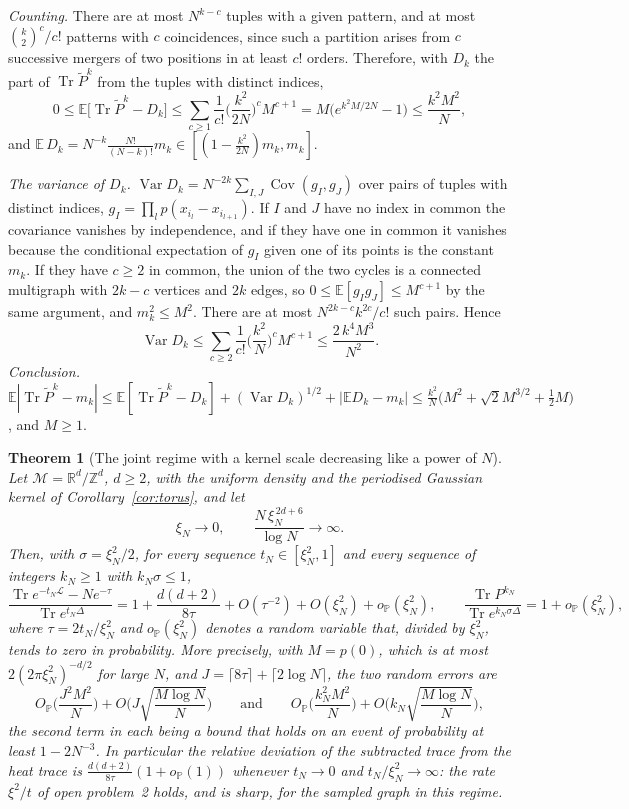 \documentclass[11pt,a4paper]{article}
\makeatletter
\theoremstyle{stmt}
\newtheorem{theorem}{Theorem}[section]
\theoremstyle{defn}
\theoremstyle{rmk}
\renewenvironment{proof}[1][\proofname]{\par\pushQED{\qed}\normalfont\topsep6\p@\@plus6\p@\relax
  \trivlist\item[\hskip\labelsep{\sffamily\itshape\small #1.}]\ignorespaces}{\popQED\endtrivlist\@endpefalse}
\numberwithin{equation}{section}
\DeclareMathOperator{\Tr}{Tr}
\newcommand{\M}{\mathcal{M}}
\newcommand{\Lc}{\mathcal{L}}
\newcommand{\R}{\mathbb{R}}
\makeatother
\begin{document}
{\begin{proof}
\emph{Counting.} There are at most $N^{k-c}$ tuples with a given pattern, and at most $\binom k2^c/c!$ patterns with $c$ coincidences, since such a partition arises from $c$ successive mergers of two positions in at least $c!$ orders. Therefore, with $D_k$ the part of $\Tr\tilde P^k$ from the tuples with distinct indices,
\[
0\le\mathbb E\big[\Tr\tilde P^k-D_k\big]\le\sum_{c\ge1}\frac{1}{c!}\Big(\frac{k^2}{2N}\Big)^cM^{c+1}=M\big(e^{k^2M/2N}-1\big)\le\frac{k^2M^2}{N},
\]
and $\mathbb E\,D_k=N^{-k}\frac{N!}{(N-k)!}m_k\in[(1-\frac{k^2}{2N})m_k,m_k]$.

\emph{The variance of $D_k$.} $\operatorname{Var}D_k=N^{-2k}\sum_{I,J}\operatorname{Cov}(g_I,g_J)$ over pairs of tuples with distinct indices, $g_I=\prod_lp(x_{i_l}-x_{i_{l+1}})$. If $I$ and $J$ have no index in common the covariance vanishes by independence, and if they have one in common it vanishes because the conditional expectation of $g_I$ given one of its points is the constant $m_k$. If they have $c\ge2$ in common, the union of the two cycles is a connected multigraph with $2k-c$ vertices and $2k$ edges, so $0\le\mathbb E[g_Ig_J]\le M^{c+1}$ by the same argument, and $m_k^2\le M^2$. There are at most $N^{2k-c}k^{2c}/c!$ such pairs. Hence
\[
\operatorname{Var}D_k\le\sum_{c\ge2}\frac1{c!}\Big(\frac{k^2}{N}\Big)^cM^{c+1}\le\frac{2\,k^4M^3}{N^2}.
\]
\emph{Conclusion.} $\mathbb E|\Tr\tilde P^k-m_k|\le\mathbb E[\Tr\tilde P^k-D_k]+(\operatorname{Var}D_k)^{1/2}+|\mathbb ED_k-m_k|\le\frac{k^2}{N}\big(M^2+\sqrt2M^{3/2}+\tfrac12M\big)$, and $M\ge1$.
\end{proof}

\begin{theorem}[The joint regime with a kernel scale decreasing like a power of $N$]\label{thm:jointpoly}
Let $\M=\R^d/\mathbb Z^d$, $d\ge2$, with the uniform density and the periodised Gaussian kernel of Corollary~\ref{cor:torus}, and let
\[
\xi_N\to0,\qquad\frac{N\,\xi_N^{\,2d+6}}{\log N}\to\infty .
\]
Then, with $\sigma=\xi_N^2/2$, for every sequence $t_N\in[\xi_N^2,1]$ and every sequence of integers $k_N\ge1$ with $k_N\sigma\le1$,
\[
\frac{\Tr e^{-t_N\Lc}-Ne^{-\tau}}{\Tr e^{t_N\Delta}}=1+\frac{d(d+2)}{8\tau}+O(\tau^{-2})+O(\xi_N^2)+o_{\mathbb P}(\xi_N^2),\qquad\frac{\Tr P^{k_N}}{\Tr e^{k_N\sigma\Delta}}=1+o_{\mathbb P}(\xi_N^2),
\]
where $\tau=2t_N/\xi_N^2$ and $o_{\mathbb P}(\xi_N^2)$ denotes a random variable that, divided by $\xi_N^2$, tends to zero in probability. More precisely, with $M=p(0)$, which is at most $2(2\pi\xi_N^2)^{-d/2}$ for large $N$, and $J=\lceil8\tau\rceil+\lceil2\log N\rceil$, the two random errors are
\[
O_{\mathbb P}\Big(\frac{J^2M^2}{N}\Big)+O\Big(J\sqrt{\frac{M\log N}{N}}\Big)\qquad\text{and}\qquad O_{\mathbb P}\Big(\frac{k_N^2M^2}{N}\Big)+O\Big(k_N\sqrt{\frac{M\log N}{N}}\Big),
\]
the second term in each being a bound that holds on an event of probability at least $1-2N^{-3}$.
In particular the relative deviation of the subtracted trace from the heat trace is $\frac{d(d+2)}{8\tau}(1+o_{\mathbb P}(1))$ whenever $t_N\to0$ and $t_N/\xi_N^2\to\infty$: the rate $\xi^2/t$ of open problem~2 holds, and is sharp, for the sampled graph in this regime.
\end{theorem}

}
\end{document}
